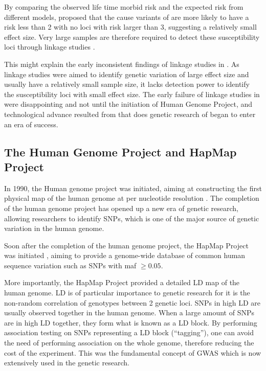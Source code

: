 	By comparing the observed life time morbid risk and the expected risk from different models, \citet{Risch1990} proposed that the cause variants of  are more likely to have a risk less than 2 with no loci with risk larger than 3, suggesting a relatively small effect size.
	Very large samples are therefore required to detect these susceptibility loci through linkage studies \citep{Risch1990}.
	
	This might explain the early inconsistent findings of linkage studies in  \citep{Harrison2005}.
	As linkage studies were aimed to identify genetic variation of large effect size and usually have a relatively small sample size, it lacks detection power to identify the susceptibility loci with small effect size.
	The early failure of linkage studies in  were disappointing and not until the initiation of Human Genome Project, and technological advance resulted from that does genetic research of  began to enter an era of success.
	
	\subsection{The Human Genome Project and HapMap Project}
	In 1990, the Human genome project was initiated, aiming at constructing the first physical map of the human genome at per nucleotide resolution \citep{Lander2001}.
	The completion of the human genome project has opened up a new era of genetic research, allowing researchers to identify \glspl{SNP}, which is one of the major source of genetic variation in the human genome.
	
	Soon after the completion of the human genome project, the HapMap Project was initiated \citep{Consortium2005}, aiming to provide a genome-wide database of common human sequence variation such as \glspl{SNP} with \gls{maf} $\ge0.05$.
	
	More importantly, the HapMap Project provided a detailed \gls{LD} map of the human genome.
	\gls{LD} is of particular importance to genetic research for it is the non-random correlation of genotypes between 2 genetic loci. 
	\glspl{SNP} in high \gls{LD} are usually observed together in the human genome.
	When a large amount of \glspl{SNP} are in high \gls{LD} together, they form what is known as a \gls{LD} block.
	By performing association testing on \glspl{SNP} representing a \gls{LD} block (``tagging''), one can avoid the need of performing association on the whole genome, therefore reducing the cost of the experiment.
	This was the fundamental concept of \gls{GWAS} which is now extensively used in the genetic research.
	
